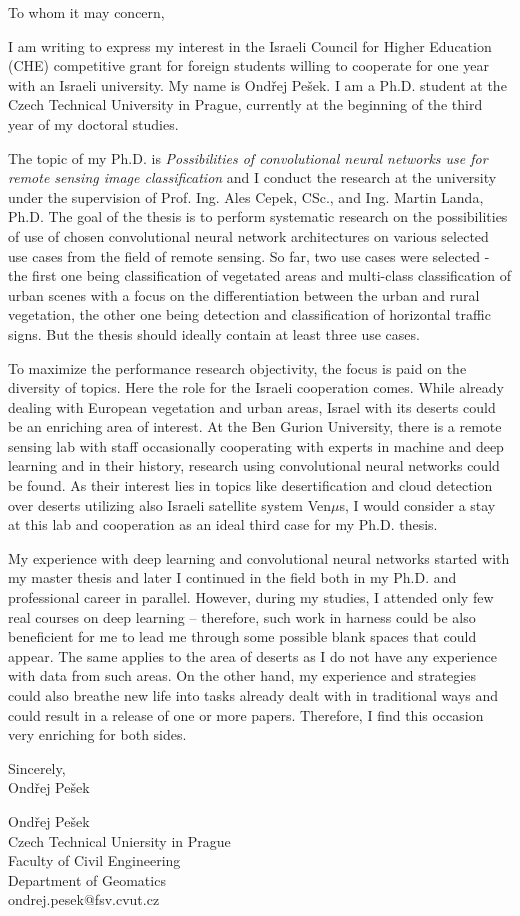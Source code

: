 \documentclass{letter}
\begin{document}
\begin{letter}{}

\date{}

\opening{To whom it may concern,}
I am writing to express my interest in the Israeli Council for Higher Education
(CHE) competitive grant for foreign students willing to cooperate for one year
with an Israeli university. My name is Ondřej Pešek. I am a Ph.D. student at
the Czech Technical University in Prague, currently at the beginning of
the third year of my doctoral studies.

The topic of my Ph.D. is \textit{Possibilities of convolutional neural networks
use for remote sensing image classification} and I conduct the research at
the university under the supervision of Prof. Ing. Ales Cepek, CSc., and
Ing. Martin Landa, Ph.D. The goal of the thesis is to perform systematic
research on the possibilities of use of chosen convolutional neural network
architectures on various selected use cases from the field of remote sensing.
So far, two use cases were selected - the first one being classification of
vegetated areas and multi-class classification of urban scenes with a focus on
the differentiation between the urban and rural vegetation, the other one being
detection and classification of horizontal traffic signs. But the thesis should
ideally contain at least three use cases.

To maximize the performance research objectivity, the focus is paid on
the diversity of topics. Here the role for the Israeli cooperation comes. While
already dealing with European vegetation and urban areas, Israel with its
deserts could be an enriching area of interest. At the Ben Gurion University,
there is a remote sensing lab with staff occasionally cooperating with experts
in machine and deep learning and in their history, research using convolutional
neural networks could be found. As their interest lies in topics like
desertification and cloud detection over deserts utilizing also Israeli
satellite system Ven$\mu$s, I would consider a stay at this lab and cooperation
as an ideal third case for my Ph.D. thesis.

My experience with deep learning and convolutional neural networks started with
my master thesis and later I continued in the field both in my Ph.D. and
professional career in parallel. However, during my studies, I attended only
few real courses on deep learning -- therefore, such work in harness could be
also beneficient for me to lead me through some possible blank spaces that
could appear. The same applies to the area of deserts as I do not have any
experience with data from such areas. On the other hand, my experience and
strategies could also breathe new life into tasks already dealt with in
traditional ways and could result in a release of one or more papers.
Therefore, I find this occasion very enriching for both sides.

\closing{Sincerely,\\
Ondřej Pešek
}

Ondřej Pešek\\
Czech Technical Uniersity in Prague\\
Faculty of Civil Engineering\\
Department of Geomatics\\
ondrej.pesek@fsv.cvut.cz
\end{letter}
\end{document}
